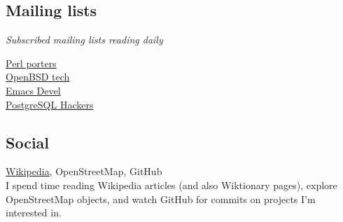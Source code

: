 \documentclass {article}
\begin{document}
    \subsection{Mailing lists}
      \textit{Subscribed mailing lists reading daily}
      \begin{description}
        \item[\href{https://lists.perl.org/list/perl5-porters.html}{Perl porters}]
        \item[\href{https://www.openbsd.org/mail.html}{OpenBSD tech}]
        \item[\href{https://lists.gnu.org/mailman/listinfo/emacs-devel}{Emacs Devel}]
        \item[\href{https://www.postgresql.org/list/pgsql-hackers/}{PostgreSQL Hackers}]
      \end{description}

    \subsection{Social}
    \href{https://en.wikipedia.org/wiki/User:Rwp0}{Wikipedia}, OpenStreetMap, GitHub\\
    I spend time reading Wikipedia articles (and also Wiktionary pages), explore OpenStreetMap objects, and watch GitHub for commits on projects I'm interested in.

  {} %
\end{document}

